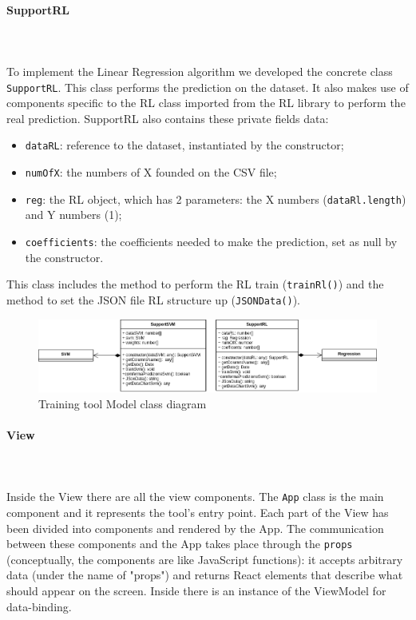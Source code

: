 \paragraph*{SupportRL}\mbox{} \\ \mbox{} \\
To implement the Linear Regression algorithm we developed the concrete class \texttt{SupportRL}. This class performs the prediction on the dataset. It also makes use of components specific to the RL class imported from the RL library to perform the real prediction. SupportRL also contains these private fields data: \begin{itemize}
\item \texttt{dataRL}: reference to the dataset, instantiated by the constructor;
\item \texttt{numOfX}: the numbers of X founded on the CSV file;
\item \texttt{reg}: the RL object, which has 2 parameters: the X numbers (\texttt{dataRl.length}) and Y numbers (1);
\item \texttt{coefficients}: the coefficients needed to make the prediction, set as null by the constructor.
\end{itemize}
This class includes the method to perform the RL train (\texttt{trainRl()}) and the method to set the JSON file RL structure up (\texttt{JSONData()}).

\begin{figure}[H]
\centering
\includegraphics[scale=0.5]{../../../Diagrams/Classes_diagrams/tool_model.png}
\caption{Training tool Model class diagram}
\end{figure}

\paragraph{View}\mbox{} \\ \mbox{} \\
Inside the View there are all the view components.
The \texttt{App} class is the main component and it represents the tool's entry point. Each part of the View has been divided into components and rendered by the App. The communication between these components and the App takes place through the \texttt{props} (conceptually, the components are like JavaScript functions): it accepts arbitrary data (under the name of "props") and returns React elements that describe what should appear on the screen.
Inside there is an instance of the ViewModel for data-binding.

